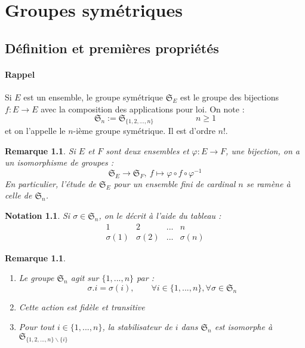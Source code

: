 \documentclass[a4paper, oneside]{report}
\theoremstyle{break}
\newtheorem{nota}[thm]{Notation}
\newtheorem{remar}[thm]{Remarque}
\renewcommand{\S}{\mathfrak{S}}
\begin{document}
\chapter{Groupes symétriques}

\section{Définition et premières propriétés}

\subsubsection{Rappel}
Si $E$ est un ensemble, le groupe symétrique $\S_E$ est le groupe des bijections $f:E\rightarrow E$ avec la composition des applications pour loi. On note :
$$\S_n := \S_{\{1,2,...,n \}} \hspace{5em} n\geq 1$$
et on l'appelle le $n$-ième groupe symétrique. Il est d'ordre $n!$.

\begin{remar}
	Si $E$ et $F$ sont deux ensembles et $\varphi:E\rightarrow F$, une bijection, on a un isomorphisme de groupes :
	$$\S_E \rightarrow \S_F,~f\mapsto \varphi\circ f \circ \varphi^{-1}$$
	En particulier, l'étude de $\S_E$ pour un ensemble fini de cardinal $n$ se ramène à celle de $\S_n$.
\end{remar}

\begin{nota}
	Si $\sigma\in \S_n$, on le décrit à l'aide du tableau :
	$$\begin{array}{llll}
	1&2&...&n\\
	\sigma(1)&\sigma(2)&...&\sigma(n)
	\end{array}$$
\end{nota}

\begin{remar}
	\begin{enumerate}
		\item Le groupe $\S_n$ agit sur $\{1,...,n\}$ par :
		$$\sigma.i=\sigma(i), \hspace{2em} \forall i\in \{1,...,n\}, \forall \sigma \in \S_n$$
		
		\item Cette action est fidèle et transitive
		
		\item Pour tout $i\in \{1,...,n\}$, la stabilisateur de $i$ dans $\S_n$ est isomorphe à $\S_{\{1,2,...,n \}\backslash \{i\}}$
	\end{enumerate}
\end{remar}
\end{document}
